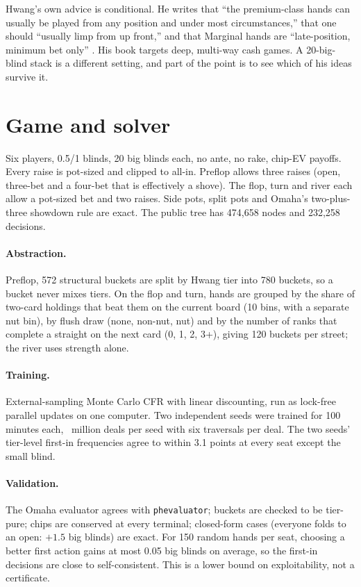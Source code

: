 \documentclass[10pt]{article}
\begin{document}
Hwang's own advice is conditional. He writes that ``the premium-class hands can usually be played
from any position and under most circumstances,'' that one should ``usually limp from up front,''
and that Marginal hands are ``late-position, minimum bet only'' \cite{hwang}. His book targets deep,
multi-way cash games. A 20-big-blind stack is a different setting, and part of the point is to see
which of his ideas survive it.

\section{Game and solver}
Six players, 0.5/1 blinds, 20 big blinds each, no ante, no rake, chip-EV payoffs. Every raise is
pot-sized and clipped to all-in. Preflop allows three raises (open, three-bet and a four-bet that is
effectively a shove). The flop, turn and river each allow a pot-sized bet and two raises. Side pots,
split pots and Omaha's two-plus-three showdown rule are exact. The public tree has 474{,}658 nodes
and 232{,}258 decisions.

\paragraph{Abstraction.} Preflop, 572 structural buckets are split by Hwang tier into 780 buckets,
so a bucket never mixes tiers. On the flop and turn, hands are grouped by the share of two-card
holdings that beat them on the current board (10 bins, with a separate nut bin), by flush draw
(none, non-nut, nut) and by the number of ranks that complete a straight on the next card
(0, 1, 2, 3+), giving 120 buckets per street; the river uses strength alone.

\paragraph{Training.} External-sampling Monte Carlo CFR with linear discounting, run as lock-free
parallel updates on one computer. Two independent seeds were trained for 100 minutes
each, \Deals\ million deals per seed with six traversals per deal. The two seeds' tier-level
first-in frequencies agree to within 3.1 points at every seat except the small blind.

\paragraph{Validation.} The Omaha evaluator agrees with \texttt{phevaluator}; buckets are checked to
be tier-pure; chips are conserved at every terminal; closed-form cases (everyone folds to an open:
$+1.5$ big blinds) are exact. For 150 random hands per seat, choosing a better first action gains
at most 0.05 big blinds on average, so the first-in decisions are close to self-consistent. This is
a lower bound on exploitability, not a certificate.
\end{document}

